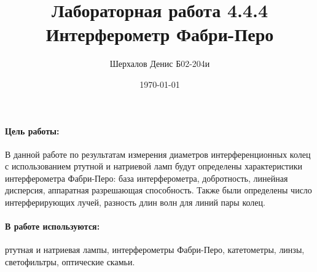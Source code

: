 \documentclass[a4paper,12pt]{article}
\author{Шерхалов Денис Б02-204и}
\title{Лабораторная работа 4.4.4 \\
	\textbf{Интерферометр Фабри-Перо}}
\date{\today}
\theoremstyle{definition}
\begin{document}
	
{\Large \maketitle}

	\paragraph*{Цель работы:} В данной работе по результатам измерения диаметров интерференционных колец с
  использованием ртутной и натриевой ламп будут определены характеристики
  интерферометра Фабри-Перо: база интерферометра, добротность, линейная дисперсия,
  аппаратная разрешающая способность. Также были определены число интерферирующих лучей,
  разность длин волн для линий пары колец.
	\paragraph*{В работе используются:} ртутная и натриевая лампы, интерферометры Фабри-Перо, катетометры, линзы, светофильтры, оптические скамьи.
\end{document}
